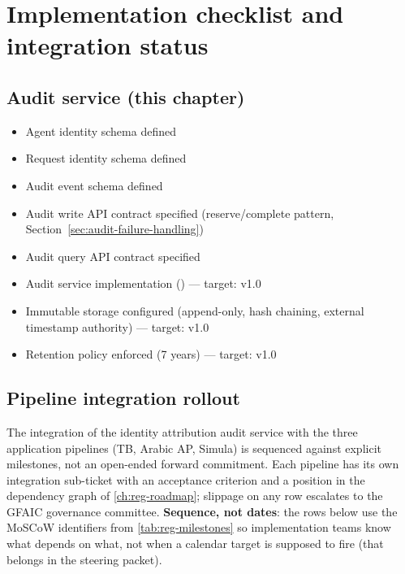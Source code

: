 \documentclass[11pt,a4paper,twoside]{report}
\begin{document}
\section{Implementation checklist and integration status}

\subsection{Audit service (this chapter)}

\begin{itemize}
\item[\texttt{[x]}] Agent identity schema defined
\item[\texttt{[x]}] Request identity schema defined
\item[\texttt{[x]}] Audit event schema defined
\item[\texttt{[x]}] Audit write API contract specified
(reserve/complete pattern, Section~\ref{sec:audit-failure-handling})
\item[\texttt{[x]}] Audit query API contract specified
\item[\texttt{[ ]}] Audit service implementation
() --- target: v1.0
\item[\texttt{[ ]}] Immutable storage configured (append-only,
hash chaining, external timestamp authority) --- target: v1.0
\item[\texttt{[ ]}] Retention policy enforced (7 years) --- target: v1.0
\end{itemize}

\subsection{Pipeline integration rollout}
\label{sec:identity-integration-rollout}

The integration of the identity attribution audit service with the
three application pipelines (TB, Arabic AP, Simula) is sequenced
against explicit milestones, not an open-ended forward commitment.
Each pipeline has its own integration sub-ticket with an acceptance
criterion and a position in the dependency graph of
\cref{ch:reg-roadmap}; slippage on any row escalates to the GFAIC
governance committee. \textbf{Sequence, not dates}: the rows below
use the MoSCoW identifiers from \cref{tab:reg-milestones} so
implementation teams know what depends on what, not when a
calendar target is supposed to fire (that belongs in the steering
packet).
\end{document}
